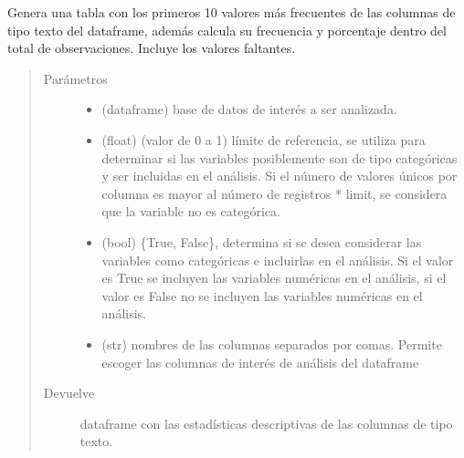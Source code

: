 \documentclass[letterpaper,10pt,openany,spanish]{sphinxmanual}
\begin{document}
\begin{fulllineitems}
\label{\detokenize{datos:datos.unique_text}}
Genera una tabla con los primeros 10 valores más frecuentes de las columnas de tipo texto del dataframe, además calcula su frecuencia y porcentaje dentro del total de observaciones. Incluye los valores faltantes.
\begin{quote}\begin{description}
\item[{Parámetros}] \leavevmode\begin{itemize}
\item {} 
 \textendash{} (dataframe) base de datos de interés a ser analizada.

\item {} 
 \textendash{} (float) (valor de 0 a 1) límite de referencia, se utiliza para determinar si las variables posiblemente son de tipo categóricas y ser incluidas en el análisis. Si el número de valores únicos por columna es mayor al número de registros * limit, se considera que la variable no es categórica.

\item {} 
 \textendash{} (bool) \{True, False\}, determina si se desea considerar las variables como categóricas e incluirlas en el análisis. Si el valor es True se incluyen las variables numéricas en el análisis, si el valor es False no se incluyen las variables numéricas en el análisis.

\item {} 
 \textendash{} (str) nombres de las columnas separados por comas. Permite escoger las columnas de interés de análisis del dataframe

\end{itemize}

\item[{Devuelve}] \leavevmode
dataframe con las estadísticas descriptivas de las columnas de tipo texto.

\end{description}\end{quote}

\end{fulllineitems}
\end{document}
